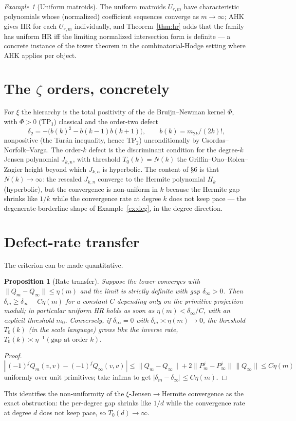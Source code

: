 \documentclass[11pt]{amsart}
\newtheorem{proposition}[theorem]{Proposition}
\theoremstyle{definition}
\theoremstyle{remark}
\newtheorem{example}[theorem]{Example}
\newcommand{\TP}{\mathrm{TP}}
\begin{document}
\begin{example}[Uniform matroids]\label{ex:matroid}
The uniform matroids $U_{r,m}$ have characteristic polynomials whose
(normalized) coefficient sequences converge as $m\to\infty$; AHK gives HR for
each $U_{r,m}$ individually, and Theorem~\ref{thm:hr} adds that the family has
uniform HR iff the limiting normalized intersection form is definite --- a
concrete instance of the tower theorem in the combinatorial-Hodge setting where
AHK applies per object.
\end{example}

\section{The $\zeta$ orders, concretely}
For $\xi$ the hierarchy is the total positivity of the de Bruijn--Newman kernel
$\Phi$, with $\Phi>0$ ($\TP_1$) classical and the order-two defect
\[
\delta_2 = -\bigl(b(k)^2-b(k-1)b(k+1)\bigr),\qquad b(k)=m_{2k}/(2k)!,
\]
nonpositive (the Tur\'an inequality, hence $\TP_2$) unconditionally by
Csordas--Norfolk--Varga. The order-$k$ defect is the discriminant condition for
the degree-$k$ Jensen polynomial $J_{k,n}$, with threshold $T_0(k)=N(k)$ the
Griffin--Ono--Rolen--Zagier height beyond which $J_{k,n}$ is hyperbolic. The
content of \S6 is that $N(k)\to\infty$: the rescaled $J_{k,n}$ converge to the
Hermite polynomial $H_k$ (hyperbolic), but the convergence is non-uniform in $k$
because the Hermite gap shrinks like $1/k$ while the convergence rate at degree
$k$ does not keep pace --- the degenerate-borderline shape of
Example~\ref{ex:deg}, in the degree direction.

\section{Defect-rate transfer}
The criterion can be made quantitative.
\begin{proposition}[Rate transfer]\label{prop:rate}
Suppose the tower converges with $\|Q_m-Q_\infty\|\le\eta(m)$ and the limit is
strictly definite with gap $\delta_\infty>0$. Then $\delta_m\ge\delta_\infty-
C\eta(m)$ for a constant $C$ depending only on the primitive-projection moduli;
in particular uniform HR holds as soon as $\eta(m)<\delta_\infty/C$, with an
explicit threshold $m_0$. Conversely, if $\delta_\infty=0$ with
$\delta_m\asymp\eta(m)\to0$, the threshold $T_0(k)$ (in the scale language) grows
like the inverse rate, $T_0(k)\asymp\eta^{-1}(\text{gap at order }k)$.
\end{proposition}
\begin{proof}
$|\,(-1)^jQ_m(v,v)-(-1)^jQ_\infty(v,v)\,|\le\|Q_m-Q_\infty\|+2\|P_m^j-P_\infty^j\|
\,\|Q_\infty\|\le C\eta(m)$ uniformly over unit primitives; take infima to get
$|\delta_m-\delta_\infty|\le C\eta(m)$.
\end{proof}
This identifies the non-uniformity of the $\xi$-Jensen$\to$Hermite convergence as
the exact obstruction: the per-degree gap shrinks like $1/d$ while the
convergence rate at degree $d$ does not keep pace, so $T_0(d)\to\infty$.
\end{document}
